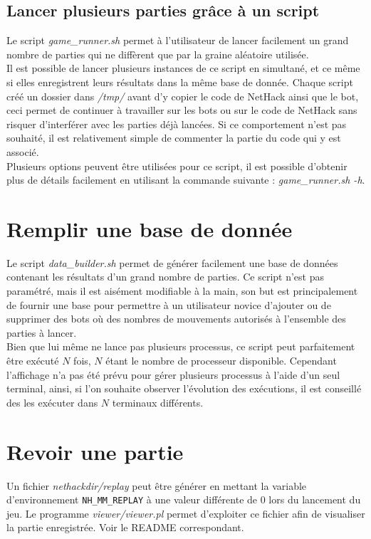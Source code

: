 \documentclass[10pt,a4paper]{report}
\begin{document}
\subsection{Lancer plusieurs parties grâce à un script}
Le script \emph{game\_runner.sh} permet à l'utilisateur de lancer facilement
un grand nombre de parties qui ne diffèrent que par la graine aléatoire
utilisée.
\\
Il est possible de lancer plusieurs instances de ce script en simultané, et ce
même si elles enregistrent leurs résultats dans la même base de donnée. Chaque
script créé un dossier dans \emph{/tmp/} avant d'y copier le code de NetHack ainsi que
le bot, ceci permet de continuer à travailler sur les bots ou sur le code de
NetHack sans risquer d'interférer avec les parties déjà lancées. Si ce
comportement n'est pas souhaité, il est relativement simple de commenter la
partie du code qui y est associé.
\\
Plusieurs options peuvent être utilisées pour ce script, il est possible
d'obtenir plus de détails facilement en utilisant la commande suivante :
\emph{game\_runner.sh -h}.

\section{Remplir une base de donnée}
Le script \emph{data\_builder.sh} permet de générer facilement une base de
données contenant les résultats d'un grand nombre de parties. Ce script n'est
pas paramétré, mais il est aisément modifiable à la main, son but est
principalement de fournir une base pour permettre à un utilisateur novice
d'ajouter ou de supprimer des bots où des nombres de mouvements autorisés à
l'ensemble des parties à lancer.
\\
Bien que lui même ne lance pas plusieurs processus, ce script peut
parfaitement être exécuté $N$ fois, $N$ étant le nombre de processeur
disponible. Cependant l'affichage n'a pas été prévu pour gérer plusieurs
processus à l'aide d'un seul terminal, ainsi, si l'on souhaite observer
l'évolution des exécutions, il est conseillé des les exécuter dans $N$
terminaux différents.

\section{Revoir une partie}

Un fichier \emph{nethackdir/replay} peut être générer en mettant la variable
d'environnement \verb!NH_MM_REPLAY! à une valeur différente de 0 lors du
lancement du jeu. Le programme \emph{viewer/viewer.pl} permet d'exploiter ce fichier afin de visualiser la partie enregistrée. Voir le README correspondant.
\end{document}
